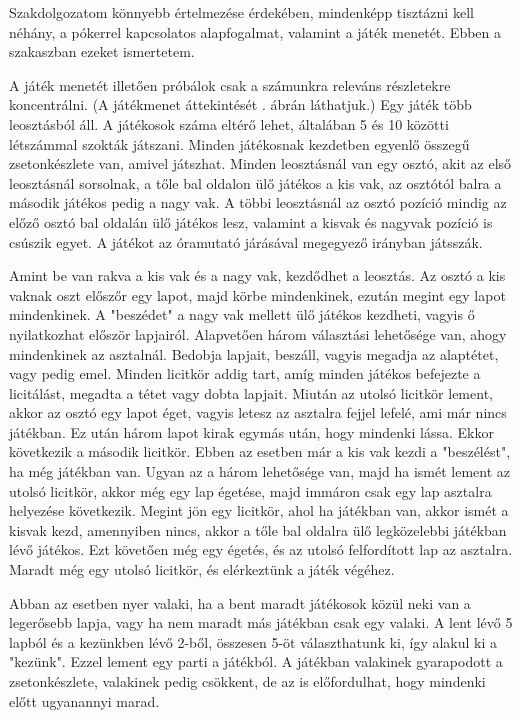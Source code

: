 

Szakdolgozatom könnyebb értelmezése érdekében, mindenképp tisztázni kell néhány, a pókerrel kapcsolatos alapfogalmat, valamint a játék menetét. Ebben a szakaszban ezeket ismertetem.


A játék menetét illetően próbálok csak a számunkra releváns részletekre koncentrálni. (A játékmenet áttekintését . ábrán láthatjuk.) Egy játék több leosztásból áll. A játékosok száma eltérő lehet, általában 5 és 10 közötti létszámmal szokták játszani. Minden játékosnak kezdetben egyenlő összegű zsetonkészlete van, amivel játszhat. Minden leosztásnál van egy osztó, akit az első leosztásnál sorsolnak, a tőle bal oldalon ülő játékos a kis vak, az osztótól balra a második játékos pedig a nagy vak. A többi leosztásnál az osztó pozíció mindig az előző osztó bal oldalán ülő játékos lesz, valamint a kisvak és nagyvak pozíció is csúszik egyet. A játékot az óramutató járásával megegyező irányban játsszák.

Amint be van rakva a kis vak és a nagy vak, kezdődhet a leosztás. Az osztó a kis vaknak oszt előszőr egy lapot, majd körbe mindenkinek, ezután megint egy lapot mindenkinek. A "beszédet" a nagy vak mellett ülő játékos kezdheti, vagyis ő nyilatkozhat először lapjairól. Alapvetően három választási lehetősége van, ahogy mindenkinek az asztalnál. Bedobja lapjait, beszáll, vagyis megadja az alaptétet, vagy pedig emel. Minden licitkör addig tart, amíg minden játékos befejezte a licitálást, megadta a tétet vagy dobta lapjait. Miután az utolsó licitkör lement, akkor az osztó egy lapot éget, vagyis letesz az asztalra fejjel lefelé, ami már nincs játékban. Ez után három lapot kirak egymás után, hogy mindenki lássa. Ekkor következik a második licitkör. Ebben az esetben már a kis vak kezdi a "beszélést", ha még játékban van. Ugyan az a három lehetősége van, majd ha ismét lement az utolsó licitkör, akkor még egy lap égetése, majd immáron csak egy lap asztalra helyezése következik. Megint jön egy licitkör, ahol ha játékban van, akkor ismét a kisvak kezd, amennyiben nincs, akkor a tőle bal oldalra ülő legközelebbi játékban lévő játékos. Ezt követően még egy égetés, és az utolsó felfordított lap az asztalra. Maradt még egy utolsó licitkör, és elérkeztünk a játék végéhez.

Abban az esetben nyer valaki, ha a bent maradt játékosok közül neki van a legerősebb lapja, vagy ha nem maradt más játékban csak egy valaki. A lent lévő 5 lapból és a kezünkben lévő 2-ből, összesen 5-öt választhatunk ki, így alakul ki a "kezünk". Ezzel lement egy parti a játékból. A játékban valakinek gyarapodott a zsetonkészlete, valakinek pedig csökkent, de az is előfordulhat, hogy mindenki előtt ugyanannyi marad.

